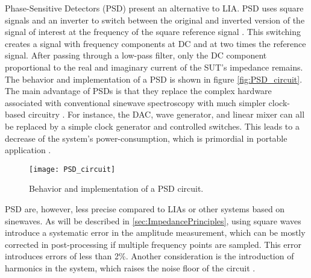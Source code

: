 Phase-Sensitive Detectors (PSD) present an alternative to LIA. PSD uses square signals and an inverter to switch between the original and inverted version of the signal of interest at the frequency of the square reference signal \cite{horowitz1989art}. This switching creates a signal with frequency components at DC and at two times the reference signal. After passing through a low-pass filter, only the DC component proportional to the real and imaginary current of the SUT’s impedance remains. The behavior and implementation of a PSD is shown in figure \autoref{fig:PSD_circuit}. The main advantage of PSDs is that they replace the complex hardware associated with conventional sinewave spectroscopy with much simpler clock-based circuitry \cite{Subhan2019}. For instance, the DAC, wave generator, and linear mixer can all be replaced by a simple clock generator and controlled switches. This leads to a decrease of the system’s power-consumption, which is primordial in portable application \cite{Subhan2019}. \par
\begin{figure}[h]
    \centering
    \texttt{[image: PSD\_circuit]}
    \caption{Behavior and implementation of a PSD circuit.}
    \label{fig:PSD_circuit}
\end{figure}
PSD are, however, less precise compared to LIAs or other systems based on sinewaves. As will be described in \autoref{sec:ImpedancePrinciples}, using square waves introduce a systematic error in the amplitude measurement, which can be mostly corrected in post-processing if multiple frequency points are sampled. This error introduces errors of less than 2\%. Another consideration is the introduction of harmonics in the system, which raises the noise floor of the circuit \cite{Subhan2019}. 